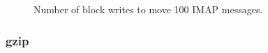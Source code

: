 \begin{figure}[htb]
\caption{\label{fig:imap-compare} Number of block writes to move 100
  IMAP messages.}
\end{figure}

\subsubsection {gzip}
